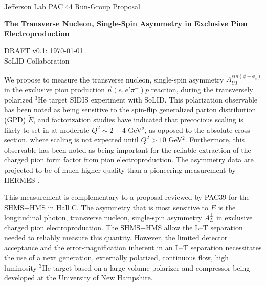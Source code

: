 \documentclass[preprint,superscriptaddress]{revtex4}
\begin{document}
\verb| |\\   %

\begin{center}
{\large
\protect{\vspace{-2cm}}
Jefferson Lab PAC 44 Run-Group Proposal

\bf{The Transverse Nucleon, Single-Spin Asymmetry in
Exclusive Pion Electroproduction}\\[1ex]
}

DRAFT v0.1: \today\\[2ex]

SoLID Collaboration\\
\vspace{.15cm}

\end{center}


We propose to measure the transverse nucleon, single-spin asymmetry
$A_{UT}^{sin(\phi-\phi_s)}$ in the exclusive pion production
$\vec{n}(e,e'\pi^-)p$ reaction, during the transversely polarized $^3$He target
SIDIS experiment with SoLID.  This polarization observable has been noted as
being sensitive to the spin-flip generalized parton distribution (GPD)
$\tilde{E}$, and factorization studies have indicated that precocious scaling
is likely to set in at moderate $Q^2\sim 2-4$ GeV$^2$, as opposed to the
absolute cross section, where scaling is not expected until $Q^2>10$ GeV$^2$.
Furthermore, this observable has been noted as being important for the reliable
extraction of the charged pion form factor from pion electroproduction.  The
asymmetry data are projected to be of much higher quality than a pioneering
measurement by HERMES \cite{hermes10}.

This measurement is complementary to a proposal reviewed by PAC39 \cite{atpi39}
for the SHMS+HMS in Hall C.  The asymmetry that is most sensitive to
$\tilde{E}$ is the longitudinal photon, transverse nucleon, single-spin
asymmetry $A_L^{\perp}$ in exclusive charged pion electroproduction.  The
SHMS+HMS allow the L--T separation needed to reliably measure this quantity.
However, the limited detector acceptance and the error-magnification inherent
in an L--T separation necessitates the use of a next generation, externally
polarized, continuous flow, high luminosity $^3$He target based on a large
volume polarizer and compressor being developed at the University of New
Hampshire.
\end{document}
